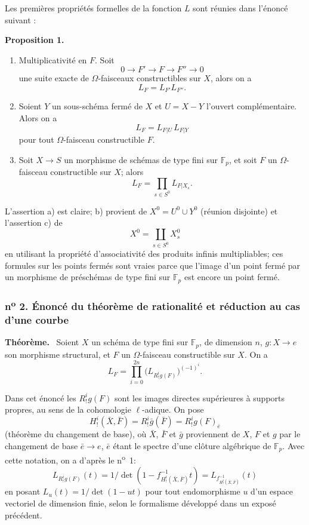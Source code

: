 \documentclass[11pt]{article}
\newenvironment{statement}[1]{\par\medskip\noindent\textbf{#1.}\ }{\par\medskip}
\begin{document}
Les premières propriétés formelles de la fonction $L$ sont réunies dans l'énoncé suivant :

\begin{statement}{Proposition 1}
\begin{enumerate}[label=\alph*)]
\item Multiplicativité en $F$. Soit
\[
0\longrightarrow F'\longrightarrow F\longrightarrow F''\longrightarrow0
\]
une suite exacte de $\Omega$-faisceaux constructibles sur $X$, alors on a
\[
L_F=L_{F'}L_{F''}.
\]
\item Soient $Y$ un sous-schéma fermé de $X$ et $U=X-Y$ l'ouvert complémentaire. Alors on a
\[
L_F=L_{F|U}\,L_{F|Y}
\]
pour tout $\Omega$-faisceau constructible $F$.
\item Soit $X\to S$ un morphisme de schémas de type fini sur $\mathbb F_p$, et soit $F$ un $\Omega$-faisceau constructible sur $X$; alors
\[
L_F=\prod_{s\in S^0}L_{F|X_s}.
\]
\end{enumerate}
\end{statement}

L'assertion a) est claire; b) provient de $X^0=U^0\cup Y^0$ (réunion disjointe) et l'assertion c) de
\[
X^0=\coprod_{s\in S^0}X_s^0
\]
en utilisant la propriété d'associativité des produits infinis multipliables; ces formules sur les points fermés sont vraies parce que l'image d'un point fermé par un morphisme de préschémas de type fini sur $\mathbb F_p$ est encore un point fermé.

\subsubsection*{n\textsuperscript{o} 2. Énoncé du théorème de rationalité et réduction au cas d'une courbe}

\begin{statement}{Théorème}
Soient $X$ un schéma de type fini sur $\mathbb F_p$, de dimension $n$, $g:X\to e$ son morphisme structural, et $F$ un $\Omega$-faisceau constructible sur $X$. On a
\[
L_F=\prod_{i=0}^{2n}\bigl(L_{R^i_!g(F)}\bigr)^{(-1)^i}.
\tag{1}
\]
\end{statement}

Dans cet énoncé les $R^i_!g(F)$ sont les images directes supérieures à supports propres, au sens de la cohomologie $\ell$-adique. On pose
\[
H^i_!(\bar X,\bar F)=R^i_!\bar g(\bar F)=R^i_!g(F)_{\bar e}
\]
(théorème du changement de base), où $\bar X$, $\bar F$ et $\bar g$ proviennent de $X$, $F$ et $g$ par le changement de base $\bar e\to e$, $\bar e$ étant le spectre d'une clôture algébrique de $\mathbb F_p$. Avec cette notation, on a d'après le n\textsuperscript{o}~1:
\[
L_{R^i_!g(F)}(t)=1/\det(1-f^{-1}_{H^i_!(\bar X,\bar F)}t)
 =L_{f^{-1}_{H^i_!(\bar X,\bar F)}}(t)
\]
en posant $L_u(t)=1/\det(1-ut)$ pour tout endomorphisme $u$ d'un espace vectoriel de dimension finie, selon le formalisme développé dans un exposé précédent.
\end{document}
